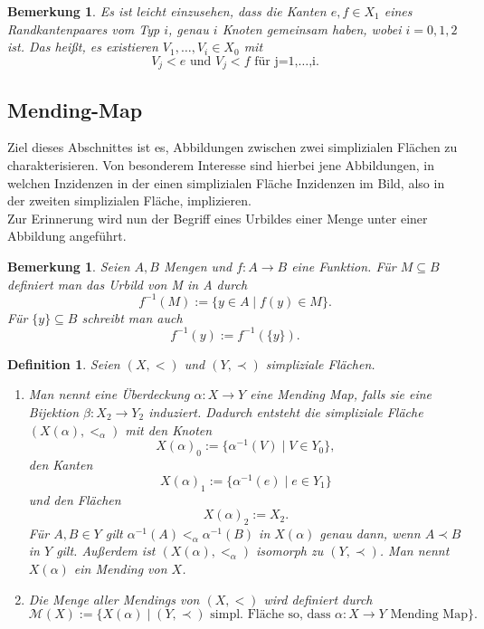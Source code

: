 \documentclass[12pt,titlepage,twoside,cleardoublepage]{article}
\theoremstyle{nummermitklammern}
\newtheorem{definition}[temp]{Definition}
\newtheorem{bemerkung}[temp]{Bemerkung}
\newtheorem{definition}[zahl]{Definition}
\newtheorem{bemerkung}[zahl]{Bemerkung}
\numberwithin{equation}{section}
\begin{document}
 \begin{bemerkung}
 Es ist leicht einzusehen, dass die Kanten $e,f \in X_1$ eines Randkantenpaares vom Typ $i$, genau $i$ Knoten gemeinsam haben, wobei $i=0,1,2$ ist. Das heißt, es existieren $V_1,\ldots,V_i \in X_0$ mit 
\[
V_j <e \text{ und } V_j <f \text{ für j=1,\ldots,i}.
\]

 \end{bemerkung}
 \subsection{Mending-Map}
 Ziel dieses Abschnittes ist es, Abbildungen zwischen zwei simplizialen Flächen zu charakterisieren. Von besonderem Interesse sind hierbei jene Abbildungen, in welchen Inzidenzen in der einen simplizialen Fläche Inzidenzen im Bild, also in der zweiten simplizialen Fläche, implizieren.\\
 Zur Erinnerung wird nun der Begriff eines Urbildes einer Menge unter einer Abbildung angeführt.
\begin{bemerkung}
Seien $A,B$ Mengen und $f:A \to B$ eine Funktion. Für $M \subseteq B$ definiert man das \emph{Urbild von M in A} durch 
\[
f^{-1}(M):=\{y\in A \mid f(y)\in M\}.
\]
Für $\{y\} \subseteq B$ schreibt man auch
\[
f^{-1}(y):=f^{-1}(\{y\}).
\]
\end{bemerkung}
  \begin{definition}
  Seien $(X,<)$ und $(Y,\prec)$ simpliziale Flächen.
  \begin{enumerate}
  \item Man nennt eine Überdeckung $\alpha:X \to Y$ eine \emph{Mending Map}, falls sie eine Bijektion $\beta : X_{2}\to Y_{2}$ induziert. Dadurch entsteht die simpliziale Fläche $(X(\alpha),<_{\alpha})$ mit den Knoten
  \[
X(\alpha)_0:=\{\alpha^{-1}(V)\mid V \in Y_0 \},
  \] 
  den Kanten 
  \[
X(\alpha)_1:=\{\alpha^{-1}(e)\mid e \in Y_1 \} 
  \]
 und den Flächen 
  \[
X(\alpha)_2:=X_2  .
  \]
  Für $A,B \in Y$ gilt $\alpha^{-1}(A)<_{\alpha}\alpha^{-1}(B)$ in $X(\alpha)$ genau dann, wenn $A \prec B  $ in $Y$ gilt. Außerdem ist $(X(\alpha),<_{\alpha})$ isomorph zu $(Y,\prec)$. Man nennt $X(\alpha)$ ein \emph{Mending von $X$}.

  \item Die Menge aller Mendings von $(X,<)$ wird definiert durch 
\[
\mathcal{M}(X):=\{  X(\alpha )\mid \text{$(Y,\prec )$ simpl. Fläche so, dass  $\alpha : X \to Y$ Mending Map}\}.
\]
  \end{enumerate}
  \end{definition}
  
\end{document}
